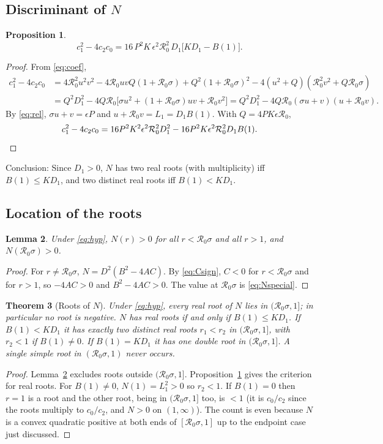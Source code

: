 \documentclass[11pt]{article}
\newtheorem{lemma}{Lemma}[section]
\newtheorem{proposition}[lemma]{Proposition}
\newtheorem{theorem}[lemma]{Theorem}
\theoremstyle{remark}
\newcommand{\R}{\mathcal R_0}
\begin{document}
\subsection{Discriminant of $N$}

\begin{proposition}\label{prop:disc}
\[
c_1^2-4c_2c_0=16\,P^2K\,\epsilon^2\R^2\,D_1\big[K D_1-B(1)\big].
\]
\end{proposition}
\begin{proof}
From \eqref{eq:coef},
\begin{align*}
c_1^2-4c_2c_0&=4\R^2u^2v^2-4\R uvQ(1+\R\sigma)+Q^2(1+\R\sigma)^2-4(u^2+Q)(\R^2v^2+Q\R\sigma)\\
&=Q^2D_1^2-4Q\R\Big[\sigma u^2+(1+\R\sigma)uv+\R v^2\Big]
=Q^2D_1^2-4Q\R(\sigma u+v)(u+\R v).
\end{align*}
By \eqref{eq:rel}, $\sigma u+v=\epsilon P$ and $u+\R v=L_1=D_1B(1)$. With $Q=4PK\epsilon\R$,
\[
c_1^2-4c_2c_0=16P^2K^2\epsilon^2\R^2D_1^2-16P^2K\epsilon^2\R^2D_1B(1). \qedhere
\]
\end{proof}
\noindent Conclusion:  Since $D_1>0$, $N$ has two real roots (with multiplicity) iff $B(1)\le KD_1$, and two distinct real roots iff $B(1)<KD_1$.

\subsection{Location of the roots}

\begin{lemma}\label{lem:outside}
Under \eqref{eq:hyp}, $N(r)>0$ for all $r<\R\sigma$ and all $r>1$, and $N(\R\sigma)>0$.
\end{lemma}
\begin{proof}
For $r\ne\R\sigma$, $N=D^2(B^2-4AC)$. By \eqref{eq:Csign}, $C<0$ for $r<\R\sigma$ and for $r>1$, so $-4AC>0$ and $B^2-4AC>0$. The value at $\R\sigma$ is \eqref{eq:Nspecial}.
\end{proof}

\begin{theorem}[Roots of $N$]\label{thm:Nroots}
Under \eqref{eq:hyp}, every real root of $N$ lies in $(\R\sigma,1]$; in particular no root is negative. $N$ has real roots if and only if $B(1)\le KD_1$. If $B(1)<KD_1$ it has exactly two distinct real roots $r_1<r_2$ in $(\R\sigma,1]$, with $r_2<1$ if $B(1)\ne0$. If $B(1)=KD_1$ it has one double root in $(\R\sigma,1]$. A single simple root in $(\R\sigma,1)$ never occurs.
\end{theorem}
\begin{proof}
Lemma~\ref{lem:outside} excludes roots outside $(\R\sigma,1]$. Proposition~\ref{prop:disc} gives the criterion for real roots. For $B(1)\ne0$, $N(1)=L_1^2>0$ so $r_2<1$. If $B(1)=0$ then $r=1$ is a root and the other root, being in $(\R\sigma,1]$ too, is $<1$ (it is $c_0/c_2$ since the roots multiply to $c_0/c_2$, and $N>0$ on $(1,\infty)$). The count is even because $N$ is a convex quadratic positive at both ends of $[\R\sigma,1]$ up to the endpoint case just discussed.
\end{proof}
\end{document}
